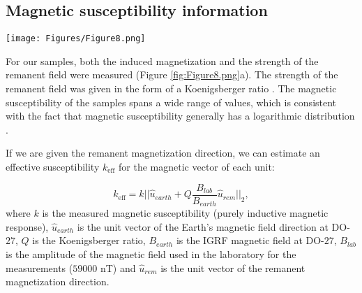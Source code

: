 \documentclass[paper, twocolumn]{geophysics} %
\begin{document}
\subsection{Magnetic susceptibility information}



\begin{figure*}%
\centering
\texttt{[image: Figures/Figure8.png]}
\caption{(a) Magnetic measurements in the laboratory; (b) $2$D projections of the $3$D GMM of the Cartesian components of the magnetic vector estimated for the background and HK units; contour lines represent iso-probability levels of the GMM, and the background color indicates the geological identification. The background unit is limited to the space defined by the small ellipsoid.}
\label{fig:Figure8.png}
\end{figure*}%

For our samples, both the induced magnetization and the strength of the remanent field were measured (Figure \ref{fig:Figure8.png}a). The strength of the remanent field was given in the form of a Koenigsberger ratio \citep{Koenigsberger}. The magnetic susceptibility of the samples spans a wide range of values, which is consistent with the fact that magnetic susceptibility generally has a logarithmic distribution \citep{LogMag,LogMag2,Enkin}.

If we are given the remanent magnetization direction, we can estimate an effective susceptibility $k_\text{eff}$ for the magnetic vector of each unit:

\begin{equation}
k_\text{eff} = k||\hat{u}_{earth}+Q \frac{{B}_{lab}}{{B}_{earth}}\hat{u}_{rem}||_2,
\end{equation}
where $k$ is the measured magnetic susceptibility (purely inductive magnetic response), $\hat{u}_{earth}$ is the unit vector of the Earth's magnetic field direction at DO-$27$, $Q$ is the Koenigsberger ratio, $B_{earth}$ is the IGRF magnetic field at DO-$27$, ${B}_{lab}$ is the amplitude of the magnetic field used in the laboratory for the measurements ($59000$ nT) and $\hat{u}_{rem}$ is the unit vector of the remanent magnetization direction.
\end{document}
